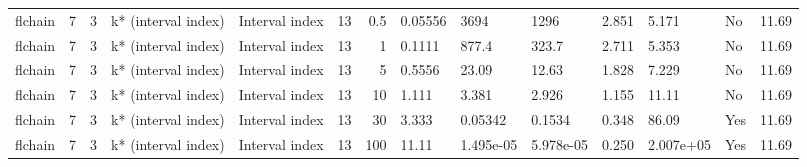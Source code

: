 \begin{tabular}{lrlllrrlllllll}
  flchain & 7 & 3 & k* (interval index) & Interval index & 13 &   0.5 & 0.05556 & 3694 & 1296 & 2.851 & 5.171 & No & 11.69 \\ 
  flchain & 7 & 3 & k* (interval index) & Interval index & 13 &     1 & 0.1111 & 877.4 & 323.7 & 2.711 & 5.353 & No & 11.69 \\ 
  flchain & 7 & 3 & k* (interval index) & Interval index & 13 &     5 & 0.5556 & 23.09 & 12.63 & 1.828 & 7.229 & No & 11.69 \\ 
  flchain & 7 & 3 & k* (interval index) & Interval index & 13 &    10 & 1.111 & 3.381 & 2.926 & 1.155 & 11.11 & No & 11.69 \\ 
  flchain & 7 & 3 & k* (interval index) & Interval index & 13 &    30 & 3.333 & 0.05342 & 0.1534 & 0.348 & 86.09 & Yes & 11.69 \\ 
  flchain & 7 & 3 & k* (interval index) & Interval index & 13 &   100 & 11.11 & 1.495e-05 & 5.978e-05 & 0.250 & 2.007e+05 & Yes & 11.69 \\ 
   \bottomrule
\end{tabular}
